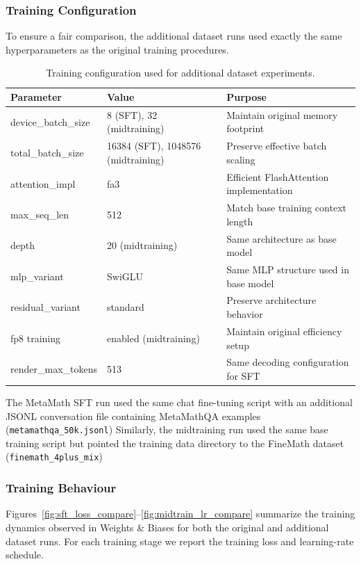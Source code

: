 \subsubsection{Training Configuration}

To ensure a fair comparison, the additional dataset runs used exactly the same
hyperparameters as the original training procedures.

\begin{table}[h]
\centering
\small
\begin{tabular}{l l l}
\hline
\textbf{Parameter} & \textbf{Value} & \textbf{Purpose} \\
\hline
device\_batch\_size & 8 (SFT), 32 (midtraining) & Maintain original memory footprint \\
total\_batch\_size & 16384 (SFT), 1048576 (midtraining) & Preserve effective batch scaling \\
attention\_impl & fa3 & Efficient FlashAttention implementation \\
max\_seq\_len & 512 & Match base training context length \\
depth & 20 (midtraining) & Same architecture as base model \\
mlp\_variant & SwiGLU & Same MLP structure used in base model \\
residual\_variant & standard & Preserve architecture behavior \\
fp8 training & enabled (midtraining) & Maintain original efficiency setup \\
render\_max\_tokens & 513 & Same decoding configuration for SFT \\
\hline
\end{tabular}
\caption{Training configuration used for additional dataset experiments.}
\end{table}

The MetaMath SFT run used the same chat fine-tuning script with an additional JSONL
conversation file containing MetaMathQA examples
(\texttt{metamathqa\_50k.jsonl}) 
Similarly, the midtraining run used the same base training script but pointed the
training data directory to the FineMath dataset
(\texttt{finemath\_4plus\_mix}) 

\subsubsection{Training Behaviour}

Figures~\ref{fig:sft_loss_compare}--\ref{fig:midtrain_lr_compare} summarize the training
dynamics observed in Weights \& Biases for both the original and additional dataset runs.
For each training stage we report the training loss and learning-rate schedule.


